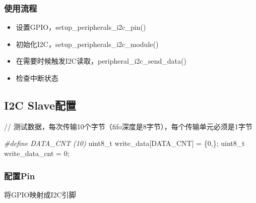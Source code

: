 \documentclass[
  12pt,
]{book}
\newenvironment{Shaded}{\begin{snugshade}}{\end{snugshade}}
\newcommand{\DataTypeTok}[1]{\textcolor[rgb]{0.13,0.29,0.53}{#1}}
\newcommand{\DecValTok}[1]{\textcolor[rgb]{0.00,0.00,0.81}{#1}}
\newcommand{\NormalTok}[1]{#1}
\newcommand{\PreprocessorTok}[1]{\textcolor[rgb]{0.56,0.35,0.01}{\textit{#1}}}
\providecommand{\tightlist}{%
  \setlength{\itemsep}{0pt}\setlength{\parskip}{0pt}}
\begin{document}
\hypertarget{ux4f7fux7528ux6d41ux7a0b}{%
\subsubsection{使用流程}\label{ux4f7fux7528ux6d41ux7a0b}}

\begin{itemize}
\tightlist
\item
  设置GPIO，setup\_peripherals\_i2c\_pin()
\item
  初始化I2C，setup\_peripherals\_i2c\_module()
\item
  在需要时候触发I2C读取，peripheral\_i2c\_send\_data()
\item
  检查中断状态
\end{itemize}

\hypertarget{i2c-slaveux914dux7f6e}{%
\subsection{I2C Slave配置}\label{i2c-slaveux914dux7f6e}}

// 测试数据，每次传输10个字节（fifo深度是8字节），每个传输单元必须是1字节

\begin{Shaded}
\begin{Highlighting}[]
\PreprocessorTok{#define DATA_CNT (10)}
\DataTypeTok{uint8_t}\NormalTok{ write_data[DATA_CNT] = \{}\DecValTok{0}\NormalTok{,\};}
\DataTypeTok{uint8_t}\NormalTok{ write_data_cnt = }\DecValTok{0}\NormalTok{;}
\end{Highlighting}
\end{Shaded}

\hypertarget{ux914dux7f6epin-1}{%
\subsubsection{配置Pin}\label{ux914dux7f6epin-1}}

将GPIO映射成I2C引脚
\end{document}
